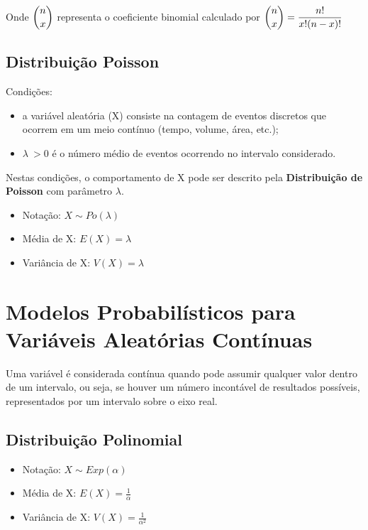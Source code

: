 Onde \(\beq{ \binom{n}{x} }\) representa o coeficiente binomial calculado por \(\beq{ \binom{n}{x} = \frac{n!}{x!(n-x)!} }\) 

\subsection{Distribuição Poisson}

Condições:
\begin{itemize}
	\item a variável aleatória (X) consiste na contagem de eventos discretos que ocorrem em um meio contínuo (tempo, volume, área, etc.);
	\item \( \lambda \ > 0 \) é o número médio de eventos ocorrendo no intervalo considerado.
\end{itemize}

Nestas condições, o comportamento de X pode ser descrito pela \textbf{Distribuição de Poisson} com parâmetro 
\( \lambda \). 

\begin{itemize}
	\item Notação: \(X \sim Po( \lambda ) \)
	\item Média de X: \( E(X) = \lambda \)
	\item Variância de X: \( V(X) = \lambda \)
\end{itemize}

\section{Modelos Probabilísticos para Variáveis Aleatórias Contínuas}

Uma variável é considerada contínua quando pode assumir qualquer valor dentro de um intervalo, ou seja, se houver um número incontável de resultados possíveis, representados por um intervalo sobre o eixo real.

\subsection{Distribuição Polinomial}

\begin{itemize}
	\item Notação: \(X \sim Exp( \alpha ) \)
	\item Média de X: \( E(X) = \frac{1}{\alpha} \)
	\item Variância de X: \( V(X) = \frac{1}{\alpha^2} \)
\end{itemize}

